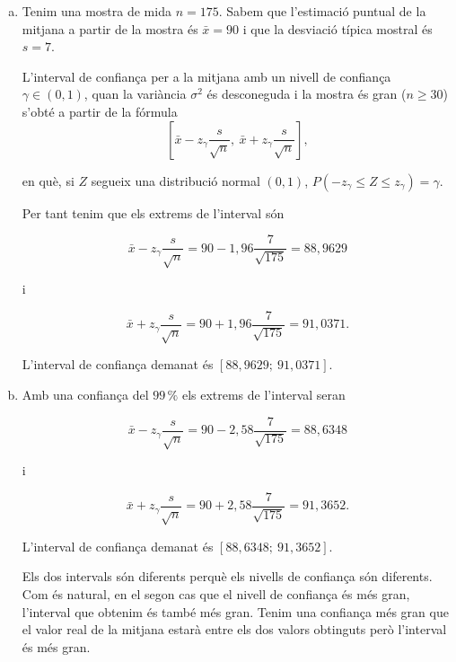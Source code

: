\begin{enumerate}
\begin{enumerate}[a)]
 \item Tenim una mostra de mida $n=175$. Sabem que l'estimació puntual de la mitjana a partir de la mostra és $\bar{x}=90$ i que la desviació típica mostral és $s=7$.

 L'interval de confiança per a la mitjana amb un nivell de confiança $\gamma\in(0,1)$, quan la variància $\sigma^2$ és desconeguda i la mostra és gran ($n\geq30$) s'obté a partir de la fórmula
 $$\left[\bar{x}-z_{\gamma}\frac{s}{\sqrt{n}},\ \bar{x}+z_{\gamma}\frac{s}{\sqrt{n}}\right],$$

 en què, si $Z$ segueix una distribució normal $(0,1)$, $P(-z_{\gamma}\leq Z\leq z_{\gamma})=\gamma$.

 Per tant tenim que els extrems de l'interval són

 $$\bar{x}-z_{\gamma}\frac{s}{\sqrt{n}}=90-1{,}96\frac{7}{\sqrt{175}}=88{,}9629$$

 i

 $$\bar{x}+z_{\gamma}\frac{s}{\sqrt{n}}=90+1{,}96\frac{7}{\sqrt{175}}=91{,}0371.$$

 L'interval de confiança demanat és $[88{,}9629;\ 91{,}0371]$.

 \item Amb una confiança del $99\,\%$ els extrems de l'interval seran

 $$\bar{x}-z_{\gamma}\frac{s}{\sqrt{n}}=90-2{,}58\frac{7}{\sqrt{175}}=88{,}6348$$

 i

 $$\bar{x}+z_{\gamma}\frac{s}{\sqrt{n}}=90+2{,}58\frac{7}{\sqrt{175}}=91{,}3652.$$

 L'interval de confiança demanat és $[88{,}6348;\ 91{,}3652]$.

 Els dos intervals són diferents perquè els nivells de confiança són diferents. Com és natural, en el segon cas que el nivell de confiança és més gran, l'interval que obtenim és també més gran. Tenim una confiança més gran que el valor real de la mitjana estarà entre els dos valors obtinguts però l'interval és més gran.
\end{enumerate}

\end{enumerate}
